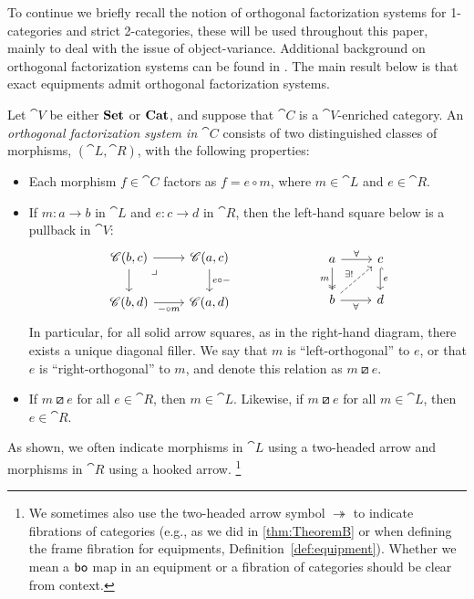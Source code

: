 \documentclass[11pt,oneside,article]{memoir}
\begin{document}
To continue we briefly recall the notion of orthogonal factorization systems for 1-categories and strict 2-categories, these will be used throughout this paper, mainly to deal with the issue of object-variance. Additional background on orthogonal factorization systems can be found in \cite[Chapter 5.5]{BorceuxV1}. The main result below is that exact equipments admit orthogonal factorization systems. 
\begin{definition}
      \label{def:orthogonal}
   Let $\cat{V}$ be either $\mathbf{Set}$ or $\mathbf{Cat}$, and suppose that $\cat{C}$ is a $\cat{V}$-enriched
   category. An \emph{orthogonal factorization system in $\cat{C}$} consists of two distinguished
   classes of morphisms, $(\cat{L},\cat{R})$, with the following properties:
   \begin{itemize}
      \item Each morphism $f\in\cat{C}$ factors as $f=e\circ m$, where $m\in\cat{L}$ and
         $e\in\cat{R}$.
      \item If $m\colon a\to b$ in $\cat{L}$ and $e\colon c\to d$ in $\cat{R}$, then the left-hand
         square below is a pullback in $\cat{V}$:
         \begin{equation}
               \label{eqn:OrthFactSys}
            \begin{tikzcd}
               \cat{C}(b,c)\ar[r]\ar[d]\ar[rd,phantom,"\lrcorner" very near start]&\cat{C}(a,c)\ar[d,"e\circ -"]\\
               \cat{C}(b,d)\ar[r,"-\circ m"']&\cat{C}(a,d)
            \end{tikzcd}
            \hspace{.9in}
            \begin{tikzcd}
               a\ar[r,"\forall"]\ar[d,two heads,"m"']&c\ar[d,hook, "e"]\\
               b\ar[r,"\forall"']\ar[ur,dashed,"\exists!"]&d
            \end{tikzcd}
         \end{equation}
         In particular, for all solid arrow squares, as in the right-hand diagram, there exists a
         unique diagonal filler. We say that $m$ is ``left-orthogonal'' to $e$, or that $e$ is
         ``right-orthogonal'' to $m$, and denote this relation as $m\boxslash e$.
      \item If $m\boxslash e$ for all $e\in\cat{R}$, then $m\in\cat{L}$. Likewise, if $m\boxslash e$
         for all $m\in\cat{L}$, then $e\in\cat{R}$.
   \end{itemize}
   As shown, we often indicate morphisms in $\cat{L}$ using a two-headed arrow and morphisms in
   $\cat{R}$ using a hooked arrow.%
\footnote{
   We sometimes also use the two-headed arrow symbol $\twoheadrightarrow$
   to indicate fibrations of categories (e.g., as we did in \ref{thm:TheoremB} or
   when defining the frame fibration for equipments, Definition~\ref{def:equipment}). Whether
   we mean a $\mathsf{bo}$ map in an equipment or a fibration of categories should be clear from context.
}

   
\end{definition}
\end{document}
